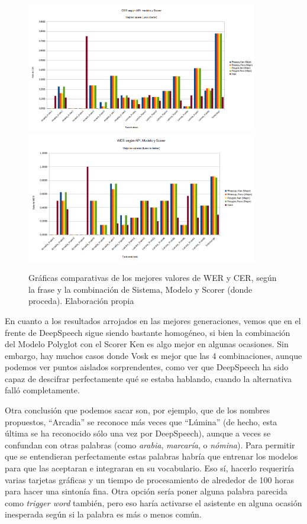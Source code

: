 \begin{figure}[H]
	\includegraphics[width=0.9\textwidth]{imagenes/CERMejores.png} \hfill \includegraphics[width=0.9\textwidth]{imagenes/WERMejores.png}
	\caption{Gráficas comparativas de los mejores valores de WER y CER, según la frase y la combinación de Sistema, Modelo y Scorer (donde proceda). Elaboración propia}
\end{figure}

En cuanto a los resultados arrojados en las mejores generaciones, vemos que en el frente de DeepSpeech sigue siendo bastante homogéneo, si bien la combinación del Modelo Polyglot con el Scorer Ken es algo mejor en algunas ocasiones. Sin embargo, hay muchos casos donde Vosk es mejor que las 4 combinaciones, aunque podemos ver puntos aislados sorprendentes, como ver que DeepSpeech ha sido capaz de descifrar perfectamente qué se estaba hablando, cuando la alternativa falló completamente.

Otra conclusión que podemos sacar son, por ejemplo, que de los nombres propuestos, ``Arcadia'' se reconoce más veces que ``Lúmina'' (de hecho, esta última se ha reconocido sólo una vez por DeepSpeech), aunque a veces se confundan con otras palabras (como \textit{arabia}, \textit{marcaría}, o \textit{nómina}). Para permitir que se entendieran perfectamente estas palabras habría que entrenar los modelos para que las aceptaran e integraran en su vocabulario. Eso sí, hacerlo requeriría varias tarjetas gráficas y un tiempo de procesamiento de alrededor de 100 horas para hacer una sintonía fina. Otra opción sería poner alguna palabra parecida como \textit{trigger word} también, pero eso haría activarse el asistente en alguna ocasión inesperada según si la palabra es más o menos común. 

